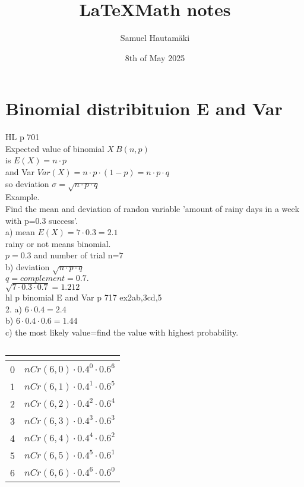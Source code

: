 \documentclass{article}
\title{\LaTeX Math notes}
\author{Samuel Hautamäki}
\date{8th of  May 2025}
\begin{document}
  \maketitle
   
  \section{Binomial distribituion E and Var}
  HL p 701\\
  Expected value of binomial $X~B(n,p)$\\
  is $E(X)=n\cdot p$\\
  and Var $Var(X)=n\cdot p\cdot (1-p)=n\cdot p\cdot q$\\
  so deviation $\sigma=\sqrt{n\cdot p\cdot q}$\\
  Example.\\
  Find the mean and deviation of randon variable 'amount of rainy days in a week with p=0.3 success'.\\
  a) mean $E(X)=7\cdot 0.3=2.1$\\
  rainy or not means binomial.\\
  $p=0.3$ and number of trial n=$7$\\
  b) deviation $\sqrt{n\cdot p\cdot q}$\\
  $q=complement=0.7.$\\
  $\sqrt{7\cdot0.3\cdot0.7}=1.212$\\
  hl p binomial E and Var p 717 ex2ab,3cd,5\\
  2. a) $6\cdot 0.4=2.4$\\
  b) $6\cdot0.4\cdot0.6=1.44$\\
  c) the most likely value=find the value with highest probability.\\
  \begin{table}
    \caption{}\label{tab:}
    \begin{center}
      \begin{tabular}[c]{l|l}
        \hline
        \multicolumn{1}{c|}{\textbf{}} & 
        \multicolumn{1}{c}{\textbf{}} \\
        \hline
        0 & $nCr(6,0)\cdot0.4^0\cdot0.6^6$ \\
        1 & $nCr(6,1)\cdot0.4^1\cdot0.6^5$  \\
        2 & $nCr(6,2)\cdot0.4^2\cdot0.6^4$  \\
        3 & $nCr(6,3)\cdot0.4^3\cdot0.6^3$  \\
        4 & $nCr(6,4)\cdot0.4^4\cdot0.6^2$  \\
        5 & $nCr(6,5)\cdot0.4^5\cdot0.6^1$  \\
        6 & $nCr(6,6)\cdot0.4^6\cdot0.6^0$  \\
        \hline
      \end{tabular}
    \end{center}
  \end{table}
\end{document}

